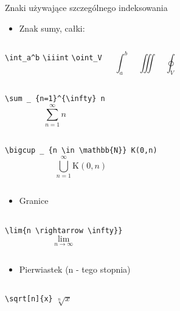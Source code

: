 \documentclass{beamer}
\theoremstyle{newblock}
\begin{document}
\begin{frame}[fragile]{Znaki używające szczególnego indeksowania}
    \begin{itemize}
        \item Znak sumy, całki:
    \end{itemize}
    \begin{columns}[onlytextwidth,c]
            \centering
            \verb|\int_a^b| \verb|\iiint| \verb|\oint_V|

            \begin{equation*}
                \int_a^b \quad \iiint \quad \oint_V
            \end{equation*}

    \end{columns}
    

    \begin{columns}[c]
            \centering 
            \verb|\sum _ {n=1}^{\infty} n|
            \begin{equation*}
                \sum _ {n=1}^{\infty} n
            \end{equation*}
    \end{columns}

    \begin{columns}[c]
            \centering 
            \verb|\bigcup _ {n \in \mathbb{N}} K(0,n)|
            \begin{equation*}
                \bigcup _ {n = 1}^\infty \mathrm{K}(0,n)
            \end{equation*}
    \end{columns}

    

    \begin{itemize}
        \item Granice
    \end{itemize}

    \begin{columns}
            \centering
            \verb|\lim{n \rightarrow \infty}}|
            \centering
            \begin{equation*}
                \lim_{n \rightarrow \infty}
            \end{equation*}  
    \end{columns}

    \begin{itemize}
        \item Pierwiastek (n - tego stopnia)
    \end{itemize}
    
    \begin{columns}
            \centering
            \verb|\sqrt[n]{x}|
            \centering
            $\sqrt[n]{x}$  
    \end{columns}
\end{frame}
\end{document}
